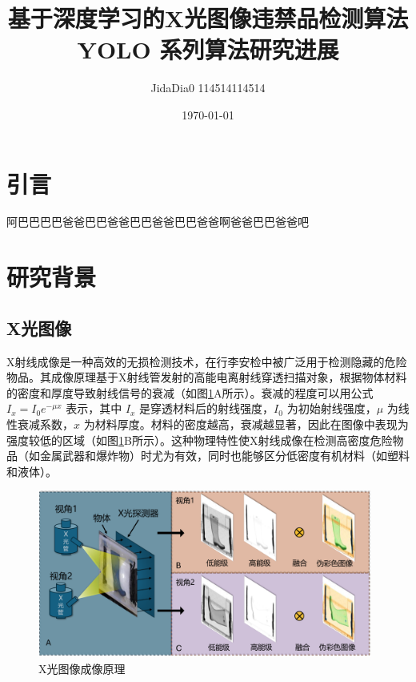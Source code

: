\documentclass[11pt,twocolumn]{ctexart}
\begin{document}
\title{\textbf{基于深度学习的X光图像违禁品检测算法}\\[1ex]YOLO 系列算法研究进展}
\author{JidaDia0 114514114514}
\date{\today}
\section{引言}
阿巴巴巴巴爸爸巴巴爸爸巴巴爸爸巴巴爸爸啊爸爸巴巴爸爸吧

\section{研究背景}


\subsection{X光图像}
X射线成像是一种高效的无损检测技术，在行李安检中被广泛用于检测隐藏的危险物品。其成像原理基于X射线管发射的高能电离射线穿透扫描对象，根据物体材料的密度和厚度导致射线信号的衰减（如图\ref{X光图像原理}A所示）。衰减的程度可以用公式 $I_x = I_0 e^{-\mu x}$ 表示，其中 $I_x$ 是穿透材料后的射线强度，$I_0$ 为初始射线强度，$\mu$ 为线性衰减系数，$x$ 为材料厚度\cite{mery2020computer}。材料的密度越高，衰减越显著，因此在图像中表现为强度较低的区域（如图\ref{X光图像原理}B所示）。这种物理特性使X射线成像在检测高密度危险物品（如金属武器和爆炸物）时尤为有效，同时也能够区分低密度有机材料（如塑料和液体）。
\begin{figure}[!hbtp]
  \begin{center}
  \includegraphics[width=0.98\textwidth]{X光示意图}
  \end{center}
  \caption{X光图像成像原理}
  \label{X光图像原理}
\end{figure}
\end{document}

